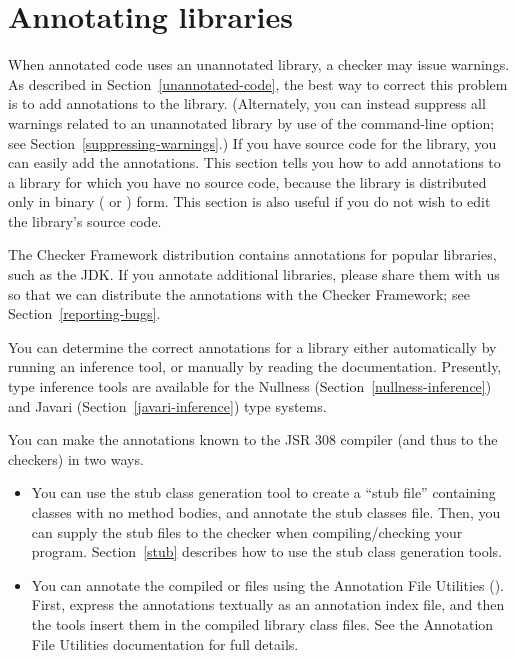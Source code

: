 \htmlhr
\chapter{Annotating libraries\label{annotating-libraries}}

When annotated code uses an unannotated library, a checker may issue warnings.
As described in Section~\ref{unannotated-code}, the best way to correct
this problem is to add annotations to the library.  (Alternately, you can instead
suppress all warnings related to an unannotated library by use of the
 command-line option; see
Section~\ref{suppressing-warnings}.)  If you have source code for the
library, you can easily add the annotations.
This section tells you
how to add annotations to a library for which you have no source code,
because the library is distributed only in binary ( or
) form.  This section is also useful if you do not wish to edit the
library's source code.

The Checker Framework distribution contains annotations
for popular libraries, such as the JDK\@.
If you annotate additional libraries, please share them with us so that we
can distribute the annotations with the Checker Framework; see
Section~\ref{reporting-bugs}.


You can determine the correct annotations for a library either
automatically by running an inference tool, or manually by reading the
documentation.  Presently, type inference tools are available for the
Nullness (Section~\ref{nullness-inference}) and Javari
(Section~\ref{javari-inference}) type systems.

You can make the annotations known to the JSR 308 compiler (and thus
to the checkers) in two ways.

\begin{itemize}

\item You can use the stub class generation tool to create a ``stub
  file'' containing classes with no method bodies,
  and annotate the stub classes
  file.  Then, you can supply the stub files to the checker when
  compiling/checking your program.
  Section~\ref{stub} describes how to use the stub class generation
  tools.

\item You can annotate the compiled
   or  files using the Annotation File Utilities
  ().
  First, express the annotations textually as an annotation index file, and
  then the tools insert them in the compiled library class files.
  See the Annotation File Utilities documentation for full details.

\end{itemize}


